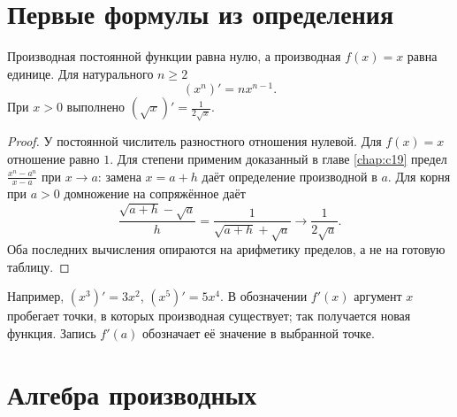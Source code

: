 \section{Первые формулы из определения}

\begin{theorem}\label{thm:legacy-c20-2}
Производная постоянной функции равна нулю, а производная \(f(x)=x\) равна единице. Для натурального \(n\ge2\)
\[
(x^n)'=nx^{n-1}.
\]
При \(x>0\) выполнено \((\sqrt x)'=\frac1{2\sqrt x}\).
\end{theorem}
\begin{proof}
У постоянной числитель разностного отношения нулевой. Для \(f(x)=x\) отношение равно \(1\). Для степени применим доказанный в главе \ref{chap:c19} предел \(\frac{x^n-a^n}{x-a}\) при \(x\to a\): замена \(x=a+h\) даёт определение производной в \(a\). Для корня при \(a>0\) домножение на сопряжённое даёт
\[
\frac{\sqrt{a+h}-\sqrt a}{h}=\frac1{\sqrt{a+h}+\sqrt a}\to\frac1{2\sqrt a}.
\]
Оба последних вычисления опираются на арифметику пределов, а не на готовую таблицу.
\end{proof}

Например, \((x^3)'=3x^2\), \((x^5)'=5x^4\). В обозначении \(f'(x)\) аргумент \(x\) пробегает точки, в которых производная существует; так получается новая функция. Запись \(f'(a)\) обозначает её значение в выбранной точке.

\section{Алгебра производных}

